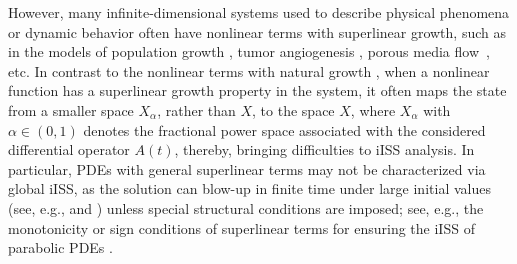 \documentclass[onecolumn]{autart}
\newenvironment{proof of Prop.ODE}{{\it Proof of Proposition~\ref{Prop.ODE}:\enspace}}{\hfill $\blacksquare$\par}
\newenvironment{proof of PDE}{{\it Proof of Proposition \ref{Prop.8}:\enspace}}{\hfill $\blacksquare$\par}
\begin{document}
However, many infinite-dimensional systems used to describe physical phenomena or dynamic behavior often have nonlinear terms with superlinear growth, such as in the models of population growth \cite{Murray2003}, tumor angiogenesis \cite{Hillen2009},  porous media flow~\cite{Vazquez2007}, etc.  In contrast to the nonlinear terms with natural growth {\cite{mironchenko2016MCRF,mironchenko2020SIAM,Hosfeld2022,damak2021input,damak2023input,Heni:2025,JoseL2023}}, when a nonlinear function  has a superlinear growth property in the system, it  often maps the state from  a smaller space  $X_\alpha$, rather than   $X$, to the space $X $,    where   $X_{\alpha}$ with $ \alpha \in (0,1)$  denotes the fractional power space  associated with the considered differential operator $A(t)$, thereby,   bringing difficulties to iISS analysis.
In particular, PDEs  with general superlinear    terms may not be characterized via  global iISS, as the solution can blow-up    in finite time   under large initial values (see, e.g.,  \cite[Chap. 5]{bebernes2013} and \cite{merle1997}) unless special structural conditions are imposed; see, e.g.,  the monotonicity or sign conditions of superlinear terms for  ensuring the   iISS  of parabolic  PDEs   \cite{zheng2018input}.  %




\end{document}
